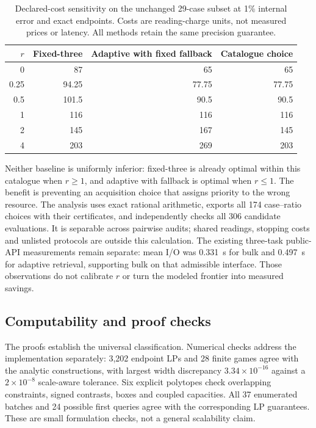 \documentclass[12pt]{article}
\begin{document}
\begin{table}[htbp]\centering\small
\caption{Declared-cost sensitivity on the unchanged 29-case subset at 1\%
internal error and exact endpoints. Costs are reading-charge units, not
measured prices or latency. All methods retain the same precision guarantee.}
\label{tab:protocol-cost-frontier}
\begin{tabular}{rrrr}\hline
$r$ & Fixed-three & Adaptive with fixed fallback & Catalogue choice\\\hline
0 & 87 & 65 & 65\\
0.25 & 94.25 & 77.75 & 77.75\\
0.5 & 101.5 & 90.5 & 90.5\\
1 & 116 & 116 & 116\\
2 & 145 & 167 & 145\\
4 & 203 & 269 & 203\\\hline
\end{tabular}\end{table}

Neither baseline is uniformly inferior: fixed-three is already optimal
within this catalogue when $r\geq1$, and adaptive with fallback is optimal
when $r\leq1$. The benefit is preventing an acquisition choice that assigns
priority to the wrong resource. The analysis uses exact rational arithmetic,
exports all 174 case--ratio choices with their certificates, and independently
checks all 306 candidate evaluations. It is separable across pairwise audits;
shared readings, stopping costs and unlisted protocols are outside this
calculation. The existing three-task public-API measurements remain separate:
mean I/O was 0.331~s for bulk and 0.497~s for adaptive retrieval, supporting
bulk on that admissible interface. Those observations do not calibrate $r$
or turn the modeled frontier into measured savings.
\subsection{Computability and proof checks}
The proofs establish the universal classification. Numerical checks address
the implementation separately: 3,202 endpoint LPs and 28 finite games agree
with the analytic constructions, with largest width discrepancy
$3.34\times10^{-16}$ against a $2\times10^{-8}$ scale-aware tolerance.
Six explicit polytopes check overlapping constraints, signed contrasts,
boxes and coupled capacities. All 37 enumerated batches and 24 possible
first queries agree with the corresponding LP guarantees. These are small
formulation checks, not a general scalability claim.
\end{document}
